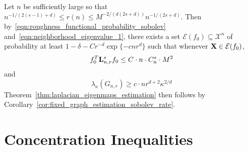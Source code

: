 \documentclass{article}
\newcommand{\1}{\mathbf{1}}
\newcommand{\Lap}{{\bf L}}
\newcommand{\Xset}{\mathcal{X}}
\theoremstyle{alden}
\theoremstyle{aldenthm}
\theoremstyle{definition}
\theoremstyle{remark}
\begin{document}
Let $n$ be sufficiently large so that $n^{-1/(2(s - 1)+ d)} \leq r(n) \leq M^{-2/(d(2s + d))} n^{-1/(2s + d)}$. Then by~\eqref{eqn:roughness_functional_probability_sobolev} and~\eqref{eqn:neighborhood_eigenvalue_1}, there exists a set $\mathcal{E}(f_0) \subseteq \Xset^n$ of probability at least $1 - \delta - Cr^{-d}\exp\{-cnr^d\}$ such that whenever ${\bf X} \in \mathcal{E}(f_0)$,
\begin{equation*}
f_0^T \Lap_{n,r}^s f_0 \leq C \cdot n \cdot C_n^s \cdot M^2
\end{equation*}
and
\begin{equation*}
\lambda_{\kappa}(G_{n,r}) \geq c \cdot nr^{d+2}\kappa^{2/d}
\end{equation*}
Theorem~\ref{thm:laplacian_eigenmaps_estimation} then follows by Corollary~\ref{cor:fixed_graph_estimation_sobolev_rate}.

\section{Concentration Inequalities}


 
\end{document}
